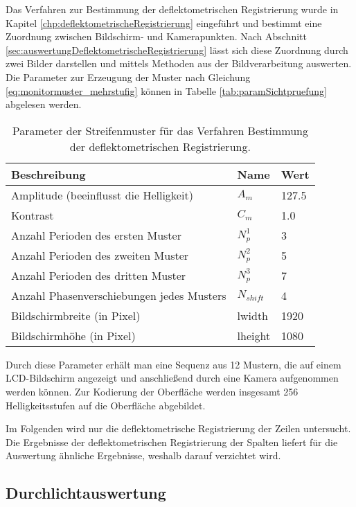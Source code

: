 Das Verfahren zur Bestimmung der deflektometrischen Registrierung wurde in Kapitel \ref{chp:deflektometrischeRegistrierung} eingeführt und bestimmt eine Zuordnung zwischen Bildschirm- und Kamerapunkten.
Nach Abschnitt \ref{sec:auswertungDeflektometrischeRegistrierung} lässt sich diese Zuordnung durch zwei Bilder darstellen und mittels Methoden aus der Bildverarbeitung auswerten.
Die Parameter zur Erzeugung der Muster nach Gleichung \ref{eq:monitormuster_mehrstufig} können in Tabelle \ref{tab:paramSichtpruefung} abgelesen werden.

\begin{table}[H]
	\centering
	\caption{Parameter der Streifenmuster für das Verfahren \glqq Bestimmung der deflektometrischen Registrierung\grqq.}
	\begin{tabular}{lll}
	\hline 
	\textbf{Beschreibung} & \textbf{Name} & \textbf{Wert} \\ 
	\hline 
	Amplitude (beeinflusst die Helligkeit) & $A_m$ & 127.5 \\
	Kontrast & $C_m$ & 1.0 \\
	Anzahl Perioden des ersten Muster & $N_p^1$ & 3 \\ 
	Anzahl Perioden des zweiten Muster & $N_p^2$ & 5 \\ 
	Anzahl Perioden des dritten Muster & $N_p^3$ & 7 \\  
	Anzahl Phasenverschiebungen jedes Musters & $N_{shift}$ & 4 \\ 
	Bildschirmbreite (in Pixel) & \acrshort{lwidth} & 1920 \\
	Bildschirmhöhe (in Pixel) & \acrshort{lheight} & 1080 \\
	\hline 
	\end{tabular}
	\label{tab:paramDeflektometrischRegistrierung}
\end{table}

\noindent
Durch diese Parameter erhält man eine Sequenz aus 12 Mustern, die auf einem LCD-Bildschirm angezeigt und anschließend durch eine Kamera aufgenommen werden können.
Zur Kodierung der Oberfläche werden insgesamt 256 Helligkeitsstufen auf die Oberfläche abgebildet.

\p
Im Folgenden wird nur die deflektometrische Registrierung der Zeilen untersucht.
Die Ergebnisse der deflektometrischen Registrierung der Spalten liefert für die Auswertung ähnliche Ergebnisse, weshalb darauf verzichtet wird.

{
	\FloatBarrier
    \subsection{Durchlichtauswertung}
    \label{sub:durchlichtAuswertungDeflektometrischeRegistrierung}
    
}

